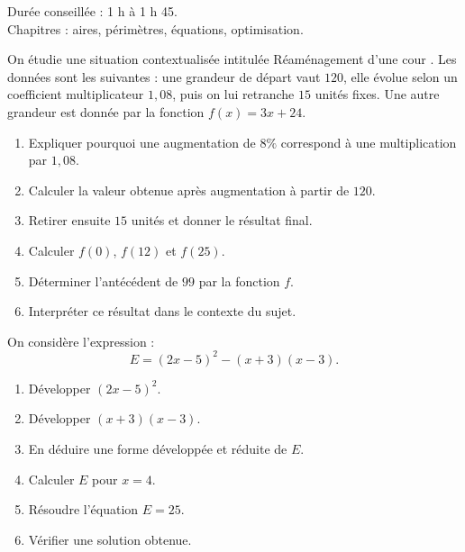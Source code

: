 \documentclass[11pt,a4paper]{article}
\newcounter{exercice}
\begin{document}
\begin{objectif}
Durée conseillée : 1 h à 1 h 45.\\
Chapitres : aires, périmètres, équations, optimisation.
\end{objectif}
\begin{exercice}
On étudie une situation contextualisée intitulée \og Réaménagement d'une cour \fg. Les données sont les suivantes : une grandeur de départ vaut $120$, elle évolue selon un coefficient multiplicateur $1{,}08$, puis on lui retranche $15$ unités fixes. Une autre grandeur est donnée par la fonction $f(x)=3x+24$.
\begin{enumerate}
  \item Expliquer pourquoi une augmentation de $8\%$ correspond à une multiplication par $1{,}08$.
  \item Calculer la valeur obtenue après augmentation à partir de $120$.
  \item Retirer ensuite $15$ unités et donner le résultat final.
  \item Calculer $f(0)$, $f(12)$ et $f(25)$.
  \item Déterminer l'antécédent de $99$ par la fonction $f$.
  \item Interpréter ce résultat dans le contexte du sujet.
\end{enumerate}
\end{exercice}

\begin{exercice}
On considère l'expression :
\[
E=(2x-5)^2-(x+3)(x-3).
\]
\begin{enumerate}
  \item Développer $(2x-5)^2$.
  \item Développer $(x+3)(x-3)$.
  \item En déduire une forme développée et réduite de $E$.
  \item Calculer $E$ pour $x=4$.
  \item Résoudre l'équation $E=25$.
  \item Vérifier une solution obtenue.
\end{enumerate}
\end{exercice}
\end{document}
